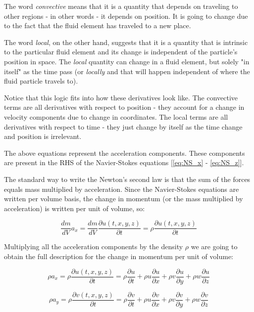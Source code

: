 The word \textit{convective} means that it is a quantity that depends on traveling to other regions - in other words - it depends on position. It is going to change due to the fact that the fluid element has traveled to a new place.

The word \textit{local}, on the other hand, suggests that it is a quantity that is intrinsic to the particular fluid element and its change is independent of the particle's position in space. The \textit{local} quantity can change in a fluid element, but solely "in itself" as the time pass (or \textit{locally} and that will happen independent of where the fluid particle travels to). 

Notice that this logic fits into how these derivatives look like. The convective terms are all derivatives with respect to position - they account for a change in velocity components due to change in coordinates. The local terms are all derivatives with respect to time - they just change by itself as the time change and position is irrelevant.

The above equations represent the acceleration components. These components are present in the RHS of the Navier-Stokes equations [\ref{eq:NS_x} - \ref{eq:NS_z}].

The standard way to write the Newton's second law is that the sum of the forces equals mass multiplied by acceleration. Since the Navier-Stokes equations are written per volume basis, the change in momentum (or the mass multiplied by acceleration) is written per unit of volume, so:

\begin{equation}
\frac{dm}{dV} a_x = \frac{dm}{dV} \frac{\partial u(t,x,y,z)}{\partial t} = \rho \frac{\partial u(t,x,y,z)}{\partial t}
\end{equation}

Multiplying all the acceleration components by the density $\rho$ we are going to obtain the full description for the change in momentum per unit of volume:

\begin{equation}
\rho a_x = \rho \frac{\partial u(t,x,y,z)}{\partial t} = \rho \frac{\partial u}{\partial t} + \rho  u \frac{\partial u}{\partial x} + \rho v \frac{\partial u}{\partial y} + \rho w \frac{\partial u}{\partial z}
\end{equation}

\begin{equation}
\rho a_y = \rho \frac{\partial v(t,x,y,z)}{\partial t} = \rho \frac{\partial v}{\partial t} + \rho u \frac{\partial v}{\partial x} + \rho v \frac{\partial v}{\partial y} + \rho w \frac{\partial v}{\partial z}
\end{equation}

